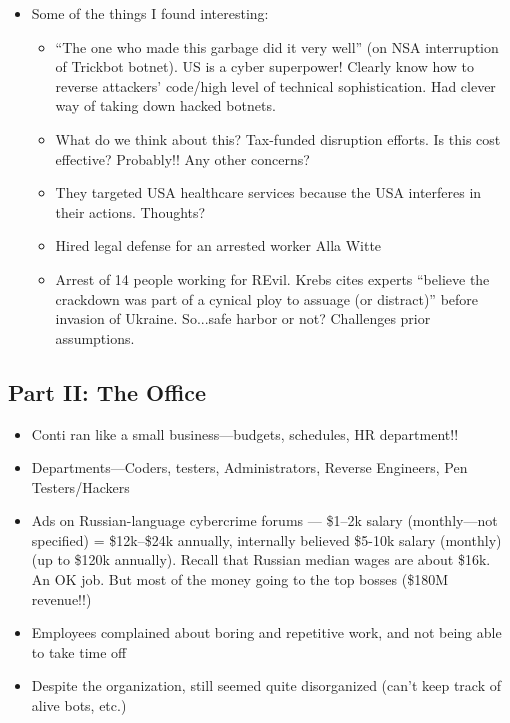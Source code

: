 \documentclass[11pt]{article}
\begin{document}
\begin{itemize}
\begin{itemize}
    \end{itemize}
    \item Some of the things I found interesting:
    \begin{itemize}
        \item ``The one who made this garbage did it very well'' (on NSA interruption of Trickbot botnet). US is a cyber superpower! Clearly know how to reverse attackers' code/high level of technical sophistication. Had clever way of taking down hacked botnets. 
        \item What do we think about this? Tax-funded disruption efforts. Is this cost effective? Probably!! Any other concerns?
        \item They targeted USA healthcare services because the USA interferes in their actions. Thoughts?
        \item Hired legal defense for an arrested worker Alla Witte
        \item Arrest of 14 people working for REvil. Krebs cites experts ``believe the crackdown was part of a cynical ploy to assuage (or distract)'' before invasion of Ukraine. So...safe harbor or not? Challenges prior assumptions.
    \end{itemize}
\end{itemize}

\subsection{Part II: The Office}

\begin{itemize}
    \item Conti ran like a small business---budgets, schedules, HR department!!
    \item Departments---Coders, testers, Administrators, Reverse Engineers, Pen Testers/Hackers
    \item Ads on Russian-language cybercrime forums --- \$1--2k salary (monthly---not specified) = \$12k--\$24k annually, internally believed \$5-10k salary (monthly) (up to \$120k annually). Recall that Russian median wages are about \$16k. An OK job. But most of the money going to the top bosses (\$180M revenue!!)
    \item Employees complained about boring and repetitive work, and not being able to take time off
    \item Despite the organization, still seemed quite disorganized (can't keep track of alive bots, etc.)
\end{itemize}
\end{document}
